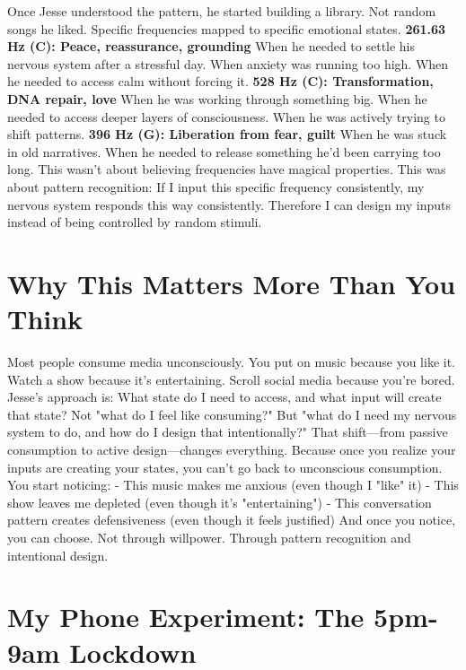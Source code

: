 \documentclass[12pt,openany]{book}
\begin{document}
Once Jesse understood the pattern, he started building a library.
Not random songs he liked. Specific frequencies mapped to specific emotional states.
\textbf{261.63 Hz (C): Peace, reassurance, grounding}
When he needed to settle his nervous system after a stressful day. When anxiety was running too high. When he needed to access calm without forcing it.
\textbf{528 Hz (C\sharp): Transformation, DNA repair, love}
When he was working through something big. When he needed to access deeper layers of consciousness. When he was actively trying to shift patterns.
\textbf{396 Hz (G): Liberation from fear, guilt}
When he was stuck in old narratives. When he needed to release something he'd been carrying too long.
This wasn't about believing frequencies have magical properties.
This was about pattern recognition: If I input this specific frequency consistently, my nervous system responds this way consistently. Therefore I can design my inputs instead of being controlled by random stimuli.

\section{Why This Matters More Than You Think}

Most people consume media unconsciously.
You put on music because you like it. Watch a show because it's entertaining. Scroll social media because you're bored.
Jesse's approach is: What state do I need to access, and what input will create that state?
Not "what do I feel like consuming?" But "what do I need my nervous system to do, and how do I design that intentionally?"
That shift—from passive consumption to active design—changes everything.
Because once you realize your inputs are creating your states, you can't go back to unconscious consumption. You start noticing:
- This music makes me anxious (even though I "like" it)
- This show leaves me depleted (even though it's "entertaining")
- This conversation pattern creates defensiveness (even though it feels justified)
And once you notice, you can choose.
Not through willpower. Through pattern recognition and intentional design.

\section{My Phone Experiment: The 5pm-9am Lockdown}
\end{document}
